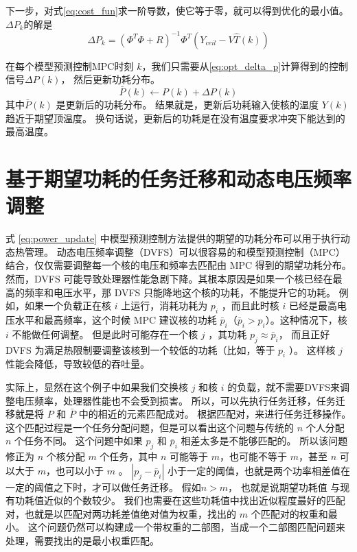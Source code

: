 下一步，对式\eqref{eq:cost_fun}求一阶导数，使它等于零，就可以得到优化的最小值。
$\Delta P_k$的解是
\begin{equation}\label{eq:opt_delta_p}
\Delta P_k = (\Phi^T \Phi + R)^{-1}\Phi^T(Y_{ceil}-V\hat{T}(k))
\end{equation}

在每个模型预测控制MPC时刻 $k$，我们只需要从\eqref{eq:opt_delta_p}计算得到的控制信号$\Delta P(k)$， 
然后更新功耗分布。
\begin{equation}\label{eq:power_update}
\bar{P}(k) \gets P(k) + \Delta P(k)
\end{equation}
其中$\bar{P}(k)$  是更新后的功耗分布。
结果就是，更新后功耗输入使核的温度 $Y(k)$ 趋近于期望顶温度。
换句话说，更新后的功耗是在没有温度要求冲突下能达到的最高温度。

\section{基于期望功耗的任务迁移和动态电压频率调整}\label{sec:dtm_mpc}

式 \eqref{eq:power_update} 中模型预测控制方法提供的期望的功耗分布可以用于执行动态热管理。
动态电压频率调整（DVFS）可以很容易的和模型预测控制（MPC）结合，仅仅需要调整每一个核的电压和频率去匹配由 MPC 得到的期望功耗分布。
然而，DVFS 可能导致处理器性能急剧下降。其根本原因是如果一个核已经在最高的频率和电压水平，那 DVFS 只能降地这个核的功耗，不能提升它的功耗。
例如，如果一个负载正在核 $i$ 上运行，消耗功耗为 $p_i$ ，而且此时核 $i$ 已经是最高电压水平和最高频率，这个时候 MPC 建议核的功耗 $\bar{p}_i$（$\bar{p}_i>p_i$）。这种情况下，核 $i$ 不能做任何调整。
但是此时可能存在一个核 $j$ ，其功耗 $p_j \approx \bar{p}_i$， 而且正好 DVFS 为满足热限制要调整该核到一个较低的功耗（比如，等于 $p_i$ ）。
这样核 $j$ 性能会降低，导致较低的吞吐量。

实际上，显然在这个例子中如果我们交换核 $j$ 和核 $i$ 的负载，就不需要DVFS来调整电压频率，处理器性能也不会受到损害。
所以，可以先执行任务迁移，任务迁移就是将 $P$ 和 $\bar{P}$ 中的相近的元素匹配成对。
根据匹配对，来进行任务迁移操作。
这个匹配过程是一个任务分配问题，但是可以看出这个问题与传统的 $n$  个人分配 $n$ 个任务不同。
这个问题中如果 $p_j$ 和 $\bar{p}_i$ 相差太多是不能够匹配的。
所以该问题修正为 $n$  个核分配 $m$ 个任务，其中 $n$ 可能等于 $m$，也可能不等于 $m$，甚至 $n$ 可以大于 $m$，也可以小于 $m$ 。
$|p_j-\bar{p}_i|$ 小于一定的阈值，也就是两个功率相差值在一定的阈值之下时，才可以做任务迁移。
假如$ n > m$， 也就是说期望功耗值 与现有功耗值近似的个数较少。
我们也需要在这些功耗值中找出近似程度最好的匹配对，也就是以匹配对两功耗差值绝对值为权重，找出的 $m$ 个匹配对的权重和最小。
这个问题仍然可以构建成一个带权重的二部图，当成一个二部图匹配问题来处理，需要找出的是最小权重匹配。

